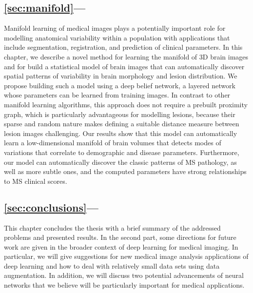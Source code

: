 \subsection*{\ref{sec:manifold}---}

Manifold learning of medical images plays a potentially important role for
modelling anatomical variability within a population with applications that
include segmentation, registration, and prediction of clinical parameters.
In this chapter, we describe a novel method for learning the manifold of 3D
brain images and for build a statistical model of brain images that can
automatically discover spatial patterns of variability in brain morphology and
lesion distribution. We propose building such a model using a deep belief
network, a layered network whose parameters can be learned from training
images. In contrast to other manifold learning algorithms, this approach does
not require a prebuilt proximity graph, which is particularly advantageous for
modelling lesions, because their sparse and random nature makes defining a
suitable distance measure between lesion images challenging. Our results show
that this model can automatically learn a low-dimensional manifold of brain
volumes that detects modes of variations that correlate to demographic and
disease parameters. Furthermore, our model can automatically discover the
classic patterns of MS pathology, as well as more subtle ones, and the
computed parameters have strong relationships to MS clinical scores.

\subsection*{\ref{sec:conclusions}---}

This chapter concludes the thesis with a brief summary of the addressed problems
and presented results. In the second part, some directions for future work are
given in the broader context of deep learning for medical imaging. In
particular, we will give suggestions for new medical image analysis applications
of deep learning and how to deal with relatively small data sets using data
augmentation. In addition, we will discuss two potential advancements of neural
networks that we believe will be particularly important for medical
applications.


